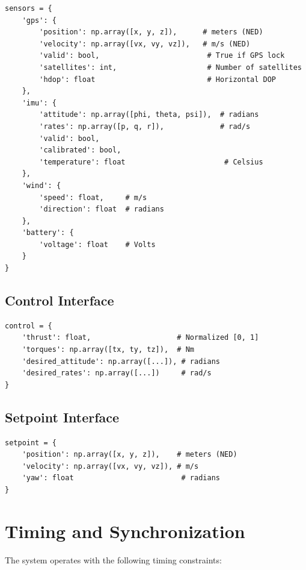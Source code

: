\begin{lstlisting}[caption={Sensor data structure}]
sensors = {
    'gps': {
        'position': np.array([x, y, z]),      # meters (NED)
        'velocity': np.array([vx, vy, vz]),   # m/s (NED)
        'valid': bool,                         # True if GPS lock
        'satellites': int,                     # Number of satellites
        'hdop': float                          # Horizontal DOP
    },
    'imu': {
        'attitude': np.array([phi, theta, psi]),  # radians
        'rates': np.array([p, q, r]),             # rad/s
        'valid': bool,
        'calibrated': bool,
        'temperature': float                       # Celsius
    },
    'wind': {
        'speed': float,     # m/s
        'direction': float  # radians
    },
    'battery': {
        'voltage': float    # Volts
    }
}
\end{lstlisting}

\subsection{Control Interface}

\begin{lstlisting}[caption={Control command structure}]
control = {
    'thrust': float,                    # Normalized [0, 1]
    'torques': np.array([tx, ty, tz]),  # Nm
    'desired_attitude': np.array([...]), # radians
    'desired_rates': np.array([...])     # rad/s
}
\end{lstlisting}

\subsection{Setpoint Interface}

\begin{lstlisting}[caption={Setpoint structure from supervisor}]
setpoint = {
    'position': np.array([x, y, z]),    # meters (NED)
    'velocity': np.array([vx, vy, vz]), # m/s
    'yaw': float                         # radians
}
\end{lstlisting}

\section{Timing and Synchronization}

The system operates with the following timing constraints:

